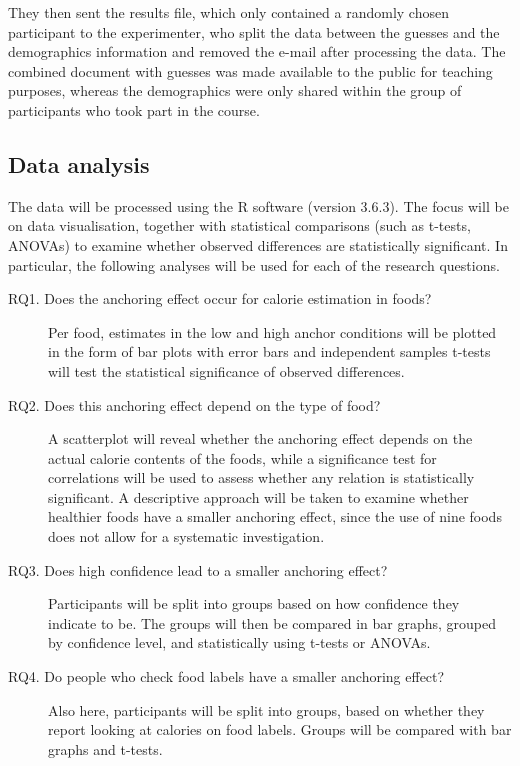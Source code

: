 \documentclass[a4paper,doc,natbib]{apa6}
\begin{document}
    They then sent the results file, which only contained a randomly chosen participant to the experimenter, who split the data between the guesses and the demographics information and removed the e-mail after processing the data. The combined document with guesses was made available to the public for teaching purposes, whereas the demographics were only shared within the group of participants who took part in the course.

    \subsection{Data analysis}

    The data will be processed using the R software (version 3.6.3). The focus will be on data visualisation, together with statistical comparisons (such as t-tests, ANOVAs) to examine whether observed differences are statistically significant. In particular, the following analyses will be used for each of the research questions.

    \begin{description}
        \item[RQ1. Does the anchoring effect occur for calorie estimation in foods?] Per food, estimates in the low and high anchor conditions will be plotted in the form of bar plots with error bars and independent samples t-tests will test the statistical significance of observed differences.
        \item[RQ2. Does this anchoring effect depend on the type of food?] A scatterplot will reveal whether the anchoring effect depends on the actual calorie contents of the foods, while a significance test for correlations will be used to assess whether any relation is statistically significant. A descriptive approach will be taken to examine whether healthier foods have a smaller anchoring effect, since the use of nine foods does not allow for a systematic investigation.
        \item[RQ3. Does high confidence lead to a smaller anchoring effect?] Participants will be split into groups based on how confidence they indicate to be. The groups will then be compared in bar graphs, grouped by confidence level, and statistically using t-tests or ANOVAs.
        \item[RQ4. Do people who check food labels have a smaller anchoring effect?] Also here, participants will be split into groups, based on whether they report looking at calories on food labels. Groups will be compared with bar graphs and t-tests.
    \end{description}
\end{document}
